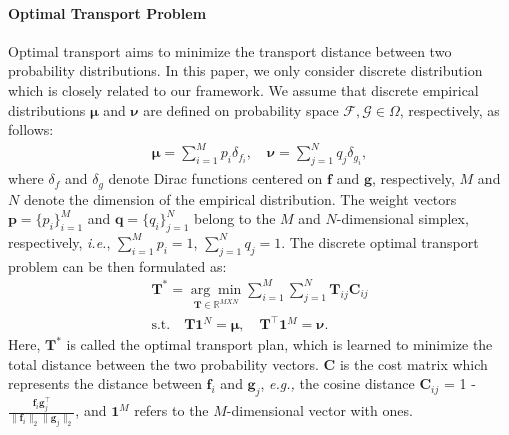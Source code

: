 \documentclass[nohyperref]{article}
\newcommand{\bs}{\boldsymbol}
\theoremstyle{plain}
\theoremstyle{definition}
\theoremstyle{remark}
\begin{document}
\paragraph{Optimal Transport Problem}
Optimal transport aims to minimize the transport distance %
between two probability distributions. In this paper, we only consider discrete distribution which is closely related to our framework. We assume that discrete empirical distributions $\bs{\mu}$ and $\bs{\nu}$ are defined on probability space $\mathcal{F}, \mathcal{G} \in \Omega$, respectively, as follows:
\begin{align}
\bs{\mu} = \sum^{M}_{i=1} p_{i} \delta_{f_{i}}, \quad \bs{\nu} = \sum^{N}_{j=1} q_{j} \delta_{ g_{i}}, 
\end{align}
where $\delta_f$ and $\delta_g$ denote Dirac functions centered on $\bs{f}$ and $\bs{g}$, respectively, $M$ and $N$ denote the dimension of the empirical distribution. %
The weight vectors $\boldsymbol{p} = \{p_i\}^M_{i=1}$ and $\boldsymbol{q} = \{q_i\}^{N}_{j=1}$  belong to the $M$ and $N$-dimensional simplex, respectively, \textit{i.e.}, $\sum^{M}_{i=1} p_i = 1$, $\sum^{N}_{j=1} q_j = 1$. The discrete optimal transport problem  can be then formulated as: 
\begin{eqnarray}
\bs{T}^{\ast} = \underset{\bs{T}\in \mathbb{R}^{MXN}}{\arg{\min}} \sum^{M}_{i=1}\sum^{N}_{j=1}\bs{T}_{ij} \bs{C}_{ij} \nonumber \\ \textrm{s.t.} \quad \bs{T}\bs{1}^{N} = \bs{\mu}, \quad \bs{T}^{\top}\bs{1}^{M} = \bs{\nu} .
\label{DOT}
\end{eqnarray}
Here,
$\bs{T}^{\ast}$ is called the optimal transport plan, which is learned to minimize %
the total distance between the two probability vectors. $\bs{C}$ is the cost matrix which represents the distance between $\boldsymbol{f}_i$ and $\boldsymbol{g}_j$, \textit{e.g.,} the cosine distance $\bs{C}_{ij}$ = 1 - $\frac{\bs{f}_i\bs{g}^{\top}_j}{\|\bs{f}_i\|_2 \|\bs{g}_j\|_2}$, and $\bs{1}^{M}$ refers to the $M$-dimensional vector with ones. 
\end{document}
